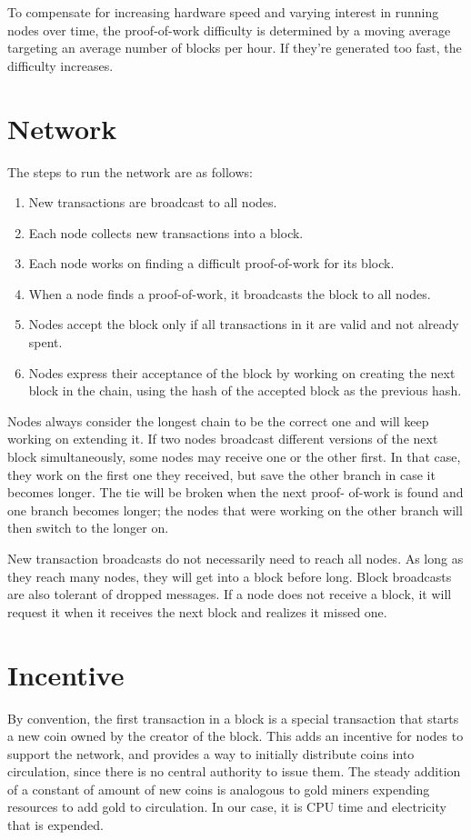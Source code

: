 \documentclass{article}
\begin{document}
To compensate for increasing hardware speed and varying interest in running nodes over time,
the proof-of-work difficulty is determined by a moving average targeting an average number of
blocks per hour.
If they're generated too fast, the difficulty increases.

\section{Network}\label{sec:network}
The steps to run the network are as follows:
    \begin{enumerate}[label={\arabic*)}] %
        \item New transactions are broadcast to all nodes.
        \item Each node collects new transactions into a block.
        \item Each node works on finding a difficult proof-of-work for its block.
        \item When a node finds a proof-of-work, it broadcasts the block to all nodes.
        \item Nodes accept the block only if all transactions in it are valid and not already spent.
        \item Nodes express their acceptance of the block by working on creating the next block in the
    chain, using the hash of the accepted block as the previous hash.
    \end{enumerate}

Nodes always consider the longest chain to be the correct one and will keep working on
extending it.
If two nodes broadcast different versions of the next block simultaneously, some
nodes may receive one or the other first.
In that case, they work on the first one they received,
but save the other branch in case it becomes longer.
The tie will be broken when the next proof-
of-work is found and one branch becomes longer; the nodes that were working on the other
branch will then switch to the longer on.

New transaction broadcasts do not necessarily need to reach all nodes.
As long as they reach
many nodes, they will get into a block before long.
Block broadcasts are also tolerant of dropped
messages.
If a node does not receive a block, it will request it when it receives the next block and
realizes it missed one.

\section{Incentive}\label{sec:incentive}
By convention, the first transaction in a block is a special transaction that starts a new coin owned
by the creator of the block.
This adds an incentive for nodes to support the network, and provides
a way to initially distribute coins into circulation, since there is no central authority to issue them.
The steady addition of a constant of amount of new coins is analogous to gold miners expending
resources to add gold to circulation.
In our case, it is CPU time and electricity that is expended.
\end{document}
